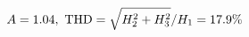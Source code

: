 \documentclass[preview]{standalone}
\begin{document}
\begin{align*}
\special{dvisvgm:raw <g id='unique000'>}A=1.04,\ \text{THD}=\sqrt{H_2^2+H_3^2}/H_1=17.9\%\special{dvisvgm:raw </g>}
\end{align*}
\end{document}
